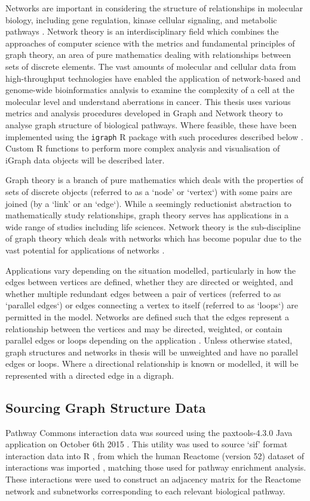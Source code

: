 Networks are important in considering the structure of relationships in molecular biology, including gene regulation, kinase cellular signaling, and metabolic pathways \citep{Barabasi2004}. Network theory is an interdisciplinary field which combines the approaches of computer science with the metrics and fundamental principles of graph theory, an area of pure mathematics dealing with relationships between sets of discrete elements. The vast amounts of molecular and cellular data from high-throughput technologies have enabled the application of network-based and genome-wide bioinformatics analysis to examine the complexity of a cell at the molecular level and understand aberrations in cancer. This thesis uses various metrics and analysis procedures developed in Graph and Network theory to analyse graph structure of biological pathways. Where feasible, these have been implemented using the \texttt{igraph} R package with such procedures described below \citep{igraph}. Custom R functions to perform more complex analysis and visualisation of iGraph data objects will be described later.

Graph theory is a branch of pure mathematics which deals with the properties of sets of discrete objects (referred to as a `node' or `vertex`) with some pairs are joined (by a `link' or an `edge`). While a seemingly reductionist abstraction to mathematically study relationships, graph theory serves has applications in a wide range of studies including life sciences. Network theory is the sub-discipline of graph theory which deals with networks which has become popular due to the vast potential for applications of networks \citep{vanSteen2010}. 

Applications vary depending on the situation modelled, particularly in how the edges between vertices are defined, whether they are directed or weighted, and whether multiple redundant edges between a pair of vertices (referred to as `parallel edges`) or edges connecting a vertex to itself (referred to as `loops`) are permitted in the model. Networks are defined such that the edges represent a relationship between the vertices and may be directed, weighted, or contain parallel edges or loops depending on the application \citep{vanSteen2010}. Unless otherwise stated, graph structures and networks in thesis will be unweighted and have no parallel edges or loops. Where a directional relationship is known or modelled, it will be represented with a directed edge in a digraph.

\subsection{Sourcing Graph Structure Data} \label{methods:graph_data}
Pathway Commons interaction data was sourced using the paxtools-4.3.0 Java application on October 6th 2015 \citep{PathwayCommons, paxtools}. This utility was used to source `sif' format interaction data into R \citep{R_core}, from which the human Reactome (version 52) dataset of interactions was imported \citep{Reactome}, matching those used for pathway enrichment analysis. These interactions were used to construct an adjacency matrix for the Reactome network and subnetworks corresponding to each relevant biological pathway. 

